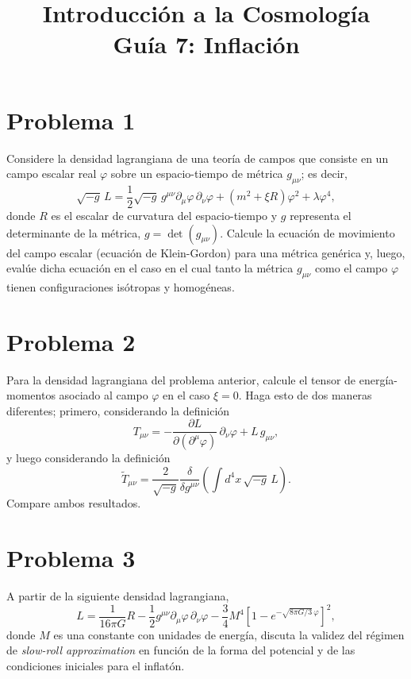 \documentclass[11pt,a4paper]{article}
\title{\textbf{Introducción a la Cosmología \\ Guía 7: Inflación}}
\date{}
\begin{document}
\maketitle

\section*{Problema 1}
Considere la densidad lagrangiana de una teoría de campos que consiste en un campo escalar real $\varphi$ sobre un espacio-tiempo de métrica $g_{\mu\nu}$; es decir,
\begin{equation}
  \sqrt{-g}\,L=\frac{1}{2}\sqrt{-g}\,g^{\mu\nu}\partial_\mu\varphi\,\partial_\nu\varphi+\left(m^2+\xi R\right)\varphi^2+\lambda\varphi^4,
\end{equation}
donde $R$ es el escalar de curvatura del espacio-tiempo y $g$ representa el determinante de la métrica, $g=\det(g_{\mu\nu})$. Calcule la ecuación de movimiento del campo escalar (ecuación de Klein-Gordon) para una métrica genérica y, luego, evalúe dicha ecuación en el caso en el cual tanto la métrica $g_{\mu\nu}$ como el campo $\varphi$ tienen configuraciones isótropas y homogéneas.

\section*{Problema 2}
Para la densidad lagrangiana del problema anterior, calcule el tensor de energía-momentos asociado al campo $\varphi$ en el caso $\xi=0$. Haga esto de dos maneras diferentes; primero, considerando la definición
\begin{equation}
  T_{\mu\nu}=-\frac{\partial L}{\partial(\partial^\mu\varphi)}\,\partial_\nu\varphi+L\,g_{\mu\nu},
\end{equation}
y luego considerando la definición
\begin{equation}
  \tilde T_{\mu\nu}=\frac{2}{\sqrt{-g}}\frac{\delta}{\delta g^{\mu\nu}}\left(\int d^4x\,\sqrt{-g}\,L\right).
\end{equation}
Compare ambos resultados.

\section*{Problema 3}
A partir de la siguiente densidad lagrangiana,
\begin{equation}
  L=\frac{1}{16\pi G}R-\frac{1}{2}g^{\mu\nu}\partial_\mu\varphi\,\partial_\nu\varphi-\frac{3}{4}M^4\left[1-e^{-\sqrt{8\pi G/3}\,\varphi}\right]^2,
\end{equation}
donde $M$ es una constante con unidades de energía, discuta la validez del régimen de \emph{slow-roll approximation} en función de la forma del potencial y de las condiciones iniciales para el inflatón.
\end{document}
